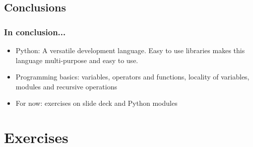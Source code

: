 \subsection*{Conclusions}
\begin{frame}[fragile]
  \frametitle{In conclusion...}
  \begin{itemize}
     \item Python: A versatile development language. Easy to use libraries makes this language multi-purpose and easy to use.
     \item Programming basics: variables, operators and functions, locality of variables, modules and recursive operations
  \end{itemize}
  \pause
    \begin{itemize}
     \item For now: exercises on slide deck and Python modules
  \end{itemize}
\end{frame}

\section{Exercises}
